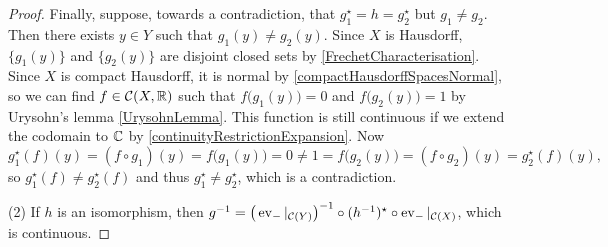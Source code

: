 \begin{proof}
Finally, suppose, towards a contradiction, that $g_1^\star = h = g_2^\star$ but $g_1 \neq g_2$. Then there exists $y\in Y$ such that $g_1(y)\neq g_2(y)$. Since $X$ is Hausdorff, $\{g_1(y)\}$ and $\{g_2(y)\}$ are disjoint closed sets by \ref{FrechetCharacterisation}. Since $X$ is compact Hausdorff, it is normal by \ref{compactHausdorffSpacesNormal}, so we can find $f\in \operatorname{\mathcal{C}}(X, \mathbb{R})$ such that $f\big(g_1(y)\big) = 0$ and $f\big(g_2(y)\big) = 1$ by Urysohn's lemma \ref{UrysohnLemma}. This function is still continuous if we extend the codomain to $\mathbb{C}$ by \ref{continuityRestrictionExpansion}.
Now
\[ g_1^\star(f)(y) = (f\circ g_1)(y) = f\big(g_1(y)\big) = 0 \neq 1 = f\big(g_2(y)\big) = (f\circ g_2)(y) = g_2^\star(f)(y), \]
so $g_1^\star(f) \neq g_2^\star(f)$ and thus $g_1^\star \neq g_2^\star$, which is a contradiction.

(2) If $h$ is an isomorphism, then $g^{-1} = \big(\operatorname{ev}_{-}|_{\operatorname{\mathcal{C}}(Y)}\big)^{-1} \circ (h^{-1})^\star \circ \operatorname{ev}_{-}|_{\operatorname{\mathcal{C}}(X)}$, which is continuous.
\end{proof}
